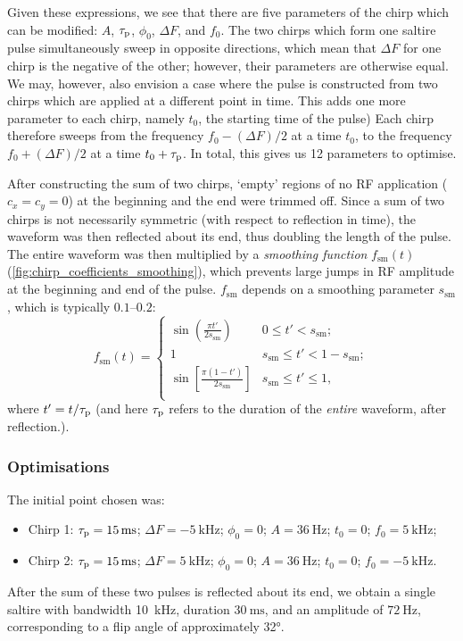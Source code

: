 Given these expressions, we see that there are five parameters of the chirp which can be modified: $A$, $\tau_\mathrm{p}$, $\phi_0$, $\Delta F$, and $f_0$.
The two chirps which form one saltire pulse simultaneously sweep in opposite directions, which mean that $\Delta F$ for one chirp is the negative of the other; however, their parameters are otherwise equal.
We may, however, also envision a case where the pulse is constructed from two chirps which are applied at a different point in time.
This adds one more parameter to each chirp, namely $t_0$, the starting time of the pulse)
Each chirp therefore sweeps from the frequency $f_0 - (\Delta F)/2$ at a time $t_0$, to the frequency $f_0 + (\Delta F)/2$ at a time $t_0 + \tau_\mathrm{p}$.
In total, this gives us 12 parameters to optimise.\autocite{Foroozandeh2020JMR,Verstraete2022JMR}

After constructing the sum of two chirps, `empty' regions of no RF application ($c_x = c_y = 0$) at the beginning and the end were trimmed off.
Since a sum of two chirps is not necessarily symmetric (with respect to reflection in time), the waveform was then reflected about its end, thus doubling the length of the pulse.
The entire waveform was then multiplied by a \textit{smoothing function} $f_\text{sm}(t)$ (\cref{fig:chirp_coefficients_smoothing}), which prevents large jumps in RF amplitude at the beginning and end of the pulse.
$f_\text{sm}$ depends on a smoothing parameter $s_\text{sm}$, which is typically $0.1$--$0.2$:
\begin{equation}
    \label{eq:sming_function}
    f_\text{sm}(t) = \begin{cases}
        \displaystyle \sin\left(\frac{\pi t'}{2 s_\text{sm}}\right) & 0 \leq t' < s_\text{sm}; \\
        \displaystyle 1 & s_\text{sm} \leq t' < 1 - s_\text{sm}; \\
        \displaystyle \sin\left[\frac{\pi (1 - t')}{2 s_\text{sm}}\right] & s_\text{sm} \leq t' \leq 1, \\
    \end{cases}
\end{equation}
where $t' = t/\tau_\mathrm{p}$ (and here $\tau_\mathrm{p}$ refers to the duration of the \textit{entire} waveform, after reflection.).


\subsubsection{Optimisations}

The initial point chosen was:
\begin{itemize}
    \item Chirp 1: $\taup = \qty{15}{\ms}$; $\Delta F = \qty{-5}{\kHz}$; $\phi_0 = 0$; $A = \qty{36}{\Hz}$; $t_0 = 0$; $f_0 = \qty{5}{\kHz}$;
    \item Chirp 2: $\taup = \qty{15}{\ms}$; $\Delta F = \qty{5}{\kHz}$; $\phi_0 = 0$; $A = \qty{36}{\Hz}$; $t_0 = 0$; $f_0 = \qty{-5}{\kHz}$.
\end{itemize}
After the sum of these two pulses is reflected about its end, we obtain a single saltire with bandwidth \qty{10}{\kHz}, duration $\qty{30}{\ms}$, and an amplitude of $\qty{72}{\Hz}$, corresponding to a flip angle of approximately \ang{32}.

